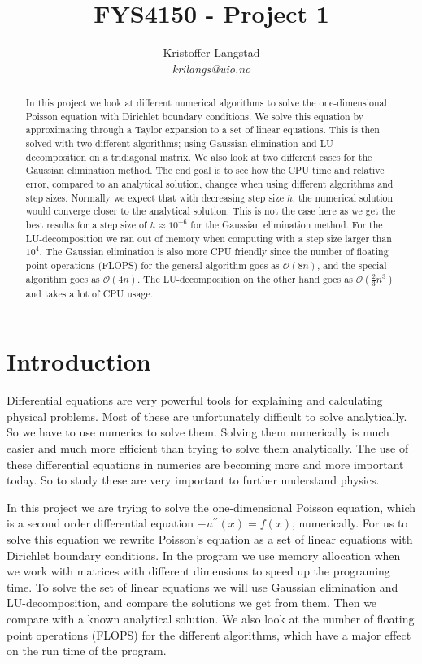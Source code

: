 \documentclass[12pt,a4paper,english]{article}
\title{FYS4150 - Project 1}
\date{}
\author{ Kristoffer Langstad\\ \textit{krilangs@uio.no}}
\begin{document}
\maketitle
\begin{abstract}
In this project we look at different numerical algorithms to solve the one-dimensional Poisson equation with Dirichlet boundary conditions. We solve this equation by approximating through a Taylor expansion to a set of linear equations. This is then solved with two different algorithms; using Gaussian elimination and LU-decomposition on a tridiagonal matrix. We also look at two different cases for the Gaussian elimination method. The end goal is to see how the CPU time and relative error, compared to an analytical solution, changes when using different algorithms and step sizes. Normally we expect that with decreasing step size $h$, the numerical solution would converge closer to the analytical solution. This is not the case here as we get the best results for a step size of $h\approx10^{-6}$ for the Gaussian elimination method. For the LU-decomposition we ran out of memory when computing with a step size larger than $10^{4}$. The Gaussian elimination is also more CPU friendly since the number of floating point operations (FLOPS) for the general algorithm goes as $\mathcal{O}(8n)$, and the special algorithm goes as $\mathcal{O}(4n)$. The LU-decomposition on the other hand goes as $\mathcal{O}(\frac{2}{3}n^3)$ and takes a lot of CPU usage.
\end{abstract}

\section{Introduction}
Differential equations are very powerful tools for explaining and calculating physical problems. Most of these are unfortunately difficult to solve analytically. So we have to use numerics to solve them. Solving them numerically is much easier and much more efficient than trying to solve them analytically. The use of these differential equations in numerics are becoming more and more important today. So to study these are very important to further understand physics.

In this project we are trying to solve the one-dimensional Poisson equation, which is a second order differential equation $-u^{\prime\prime}(x)=f(x)$, numerically. For us to solve this equation we rewrite Poisson's equation as a set of linear equations with Dirichlet boundary conditions. In the program we use memory allocation when we work with matrices with different dimensions to speed up the programing time. To solve the set of linear equations we will use Gaussian elimination and LU-decomposition, and compare the solutions we get from them. Then we compare with a known analytical solution. We also look at the number of floating point operations (FLOPS) for the different algorithms, which have a major effect on the run time of the program. 
\end{document}
